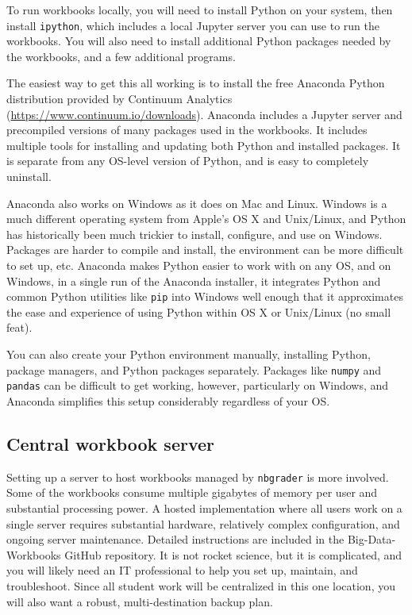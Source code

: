 \documentclass[]{krantz}
\begin{document}
To run workbooks locally, you will need to install Python on your
system, then install \texttt{ipython}, which includes a local Jupyter
server you can use to run the workbooks. You will also need to install
additional Python packages needed by the workbooks, and a few additional
programs.

The easiest way to get this all working is to install the free Anaconda
Python distribution provided by Continuum Analytics
(\url{https://www.continuum.io/downloads}). Anaconda includes a Jupyter
server and precompiled versions of many packages used in the workbooks.
It includes multiple tools for installing and updating both Python and
installed packages. It is separate from any OS-level version of Python,
and is easy to completely uninstall.

Anaconda also works on Windows as it does on Mac and Linux. Windows is a
much different operating system from Apple's OS X and Unix/Linux, and
Python has historically been much trickier to install, configure, and
use on Windows. Packages are harder to compile and install, the
environment can be more difficult to set up, etc. Anaconda makes Python
easier to work with on any OS, and on Windows, in a single run of the
Anaconda installer, it integrates Python and common Python utilities
like \texttt{pip} into Windows well enough that it approximates the ease
and experience of using Python within OS X or Unix/Linux (no small
feat).

You can also create your Python environment manually, installing Python,
package managers, and Python packages separately. Packages like
\texttt{numpy} and \texttt{pandas} can be difficult to get working,
however, particularly on Windows, and Anaconda simplifies this setup
considerably regardless of your OS.

\subsection{Central workbook server}\label{central-workbook-server}

Setting up a server to host workbooks managed by \texttt{nbgrader} is
more involved. Some of the workbooks consume multiple gigabytes of
memory per user and substantial processing power. A hosted
implementation where all users work on a single server requires
substantial hardware, relatively complex configuration, and ongoing
server maintenance. Detailed instructions are included in the
Big-Data-Workbooks GitHub repository. It is not rocket science, but it
is complicated, and you will likely need an IT professional to help you
set up, maintain, and troubleshoot. Since all student work will be
centralized in this one location, you will also want a robust,
multi-destination backup plan.
\end{document}
